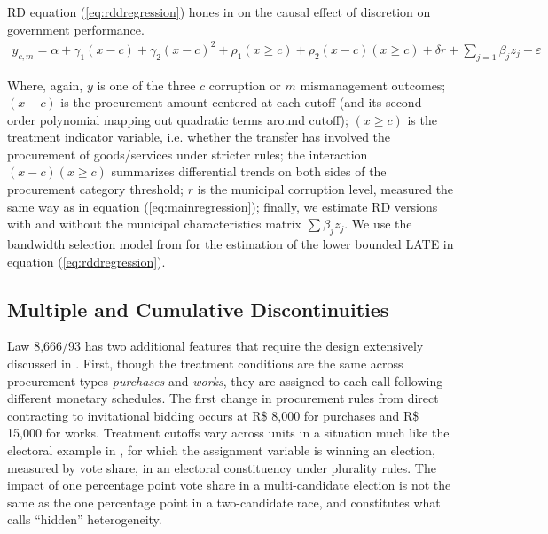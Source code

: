 \documentclass[11pt]{article}
\begin{document}
RD equation (\ref{eq:rddregression}) hones in on the causal effect of discretion on government performance.
\begin{equation} \label{eq:rddregression}
  \begin{aligned}
    y_{c,m} = \alpha + \gamma_{1}(x-c) + \gamma_{2}(x-c)^{2}+ \rho_{1}(x \geq c) + \rho_{2} (x-c) (x \geq c) + \delta r + \sum_{j = 1} \beta_{j} z_{j} + \varepsilon
  \end{aligned}
\end{equation}

Where, again, $y$ is one of the three $c$ corruption or $m$ mismanagement outcomes; $(x - c)$ is the procurement amount centered at each cutoff (and its second-order polynomial mapping out quadratic terms around cutoff); $(x \geq c)$ is the treatment indicator variable, i.e. whether the transfer has involved the procurement of goods/services under stricter rules; the interaction $(x - c)(x \geq c)$ summarizes differential trends on both sides of the procurement category threshold; $r$ is the municipal corruption level, measured the same way as in equation (\ref{eq:mainregression}); finally, we estimate RD versions with and without the municipal characteristics matrix $\sum \beta_{j} z_{j}$. We use the bandwidth selection model from \citet{CalonicoRobustNonparametricConfidence2014} for the estimation of the lower bounded LATE in equation (\ref{eq:rddregression}).

\subsection{Multiple and Cumulative Discontinuities} \label{subsec:multiplecutoff}

Law 8,666/93 has two additional features that require the design extensively discussed in \citet{CattaneoInterpretingRegressionDiscontinuity2016}. First, though the treatment conditions are the same across procurement types \emph{purchases} and \emph{works}, they are assigned to each call following different monetary schedules. The first change in procurement rules from direct contracting to invitational bidding occurs at R\$ 8,000 for purchases and R\$ 15,000 for works. Treatment cutoffs vary across units in a situation much like the electoral example in \citet{CattaneoInterpretingRegressionDiscontinuity2016}, for which the assignment variable is winning an election, measured by vote share, in an electoral constituency under plurality rules. The impact of one percentage point vote share in a multi-candidate election is not the same as the one percentage point in a two-candidate race, and constitutes what \citet{CattaneoInterpretingRegressionDiscontinuity2016} calls ``hidden'' heterogeneity.
\end{document}
